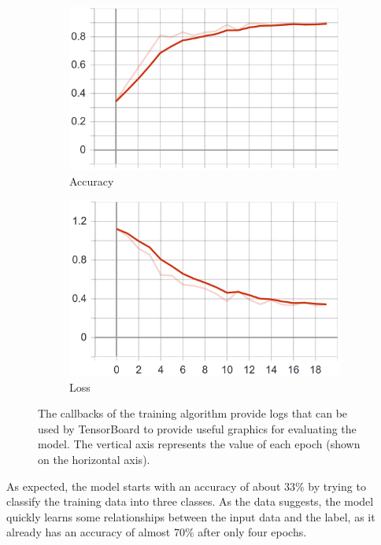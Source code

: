 \begin{figure}
    \centering
    \begin{subfigure}[b]{0.4\textwidth}
        \includegraphics[width=\textwidth]{images/first_model_acc.png}
        \caption{Accuracy}
        \label{fig:first_model_acc}
    \end{subfigure}
    \begin{subfigure}[b]{0.4\textwidth}
        \includegraphics[width=\textwidth]{images/first_model_loss.png}
        \caption{Loss}
        \label{fig:first_model_loss}
    \end{subfigure}
    \caption{The callbacks of the training algorithm provide logs that can be used by TensorBoard to provide useful graphics for evaluating the model. The vertical axis represents the value of each epoch (shown on the horizontal axis).}
    \label{fig:first_model_graphs}
\end{figure}

As expected, the model starts with an accuracy of about 33\% by trying to classify the training data into three classes.
As the data suggests, the model quickly learns some relationships between the input data and the label, as it already has an accuracy of almost 70\% after only four epochs.

